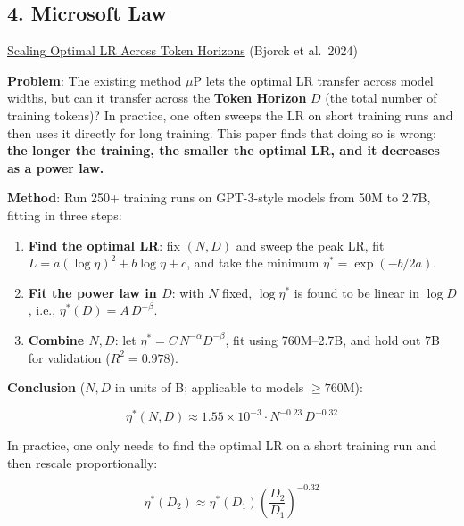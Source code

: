 \documentclass[
  english,
  11pt,
  a4paper,
]{article}
\providecommand{\tightlist}{%
  \setlength{\itemsep}{0pt}\setlength{\parskip}{0pt}}
\newenvironment{NotesFormula}{%
  \par\noindent\begin{minipage}{\linewidth}%
  \setlength{\parindent}{2em}%
  \setlength{\parskip}{0.35em}%
}{\end{minipage}\par}
\begin{document}
\clearpage

\subsection{4. Microsoft Law}\label{microsoft-law}

\href{https://arxiv.org/abs/2409.19913}{Scaling Optimal LR Across Token
Horizons} (Bjorck et al.~2024)

\textbf{Problem}: The existing method \(\mu\)P lets the optimal LR
transfer across model widths, but can it transfer across the
\textbf{Token Horizon} \(D\) (the total number of training tokens)? In
practice, one often sweeps the LR on short training runs and then uses
it directly for long training. This paper finds that doing so is wrong:
\textbf{the longer the training, the smaller the optimal LR, and it
decreases as a power law.}

\textbf{Method}: Run 250+ training runs on GPT-3-style models from 50M
to 2.7B, fitting in three steps:

\begin{enumerate}
\def\labelenumi{\arabic{enumi}.}
\tightlist
\item
  \textbf{Find the optimal LR}: fix \((N,D)\) and sweep the peak LR, fit
  \(L=a(\log\eta)^2+b\log\eta+c\), and take the minimum
  \(\eta^*=\exp(-b/2a)\).
\item
  \textbf{Fit the power law in \(D\)}: with \(N\) fixed, \(\log\eta^*\)
  is found to be linear in \(\log D\), i.e.,
  \(\eta^*(D)=A\,D^{-\beta}\).
\item
  \textbf{Combine \(N,D\)}: let \(\eta^*=C\,N^{-\alpha}D^{-\beta}\), fit
  using 760M--2.7B, and hold out 7B for validation (\(R^2=0.978\)).
\end{enumerate}

\begin{NotesFormula}

\textbf{Conclusion} (\(N,D\) in units of B; applicable to models
\(\geq 760\)M):

\[\boxed{\eta^*(N,D)\approx1.55\times10^{-3}\cdot N^{-0.23}\,D^{-0.32}}\]

\end{NotesFormula}

\begin{NotesFormula}

In practice, one only needs to find the optimal LR on a short training
run and then rescale proportionally:

\[\boxed{\eta^*(D_2)\approx\eta^*(D_1)\left(\frac{D_2}{D_1}\right)^{-0.32}}\]

\end{NotesFormula}
\end{document}
